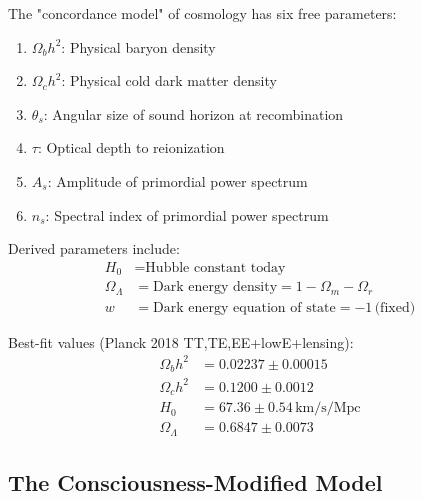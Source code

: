 \begin{defn}\label{def:lambdacdm-parameters}
The "concordance model" of cosmology\cite{planck2018} has six free parameters:
\begin{enumerate}
\item $\Omega_b h^2$: Physical baryon density
\item $\Omega_c h^2$: Physical cold dark matter density
\item $\theta_s$: Angular size of sound horizon at recombination
\item $\tau$: Optical depth to reionization
\item $A_s$: Amplitude of primordial power spectrum
\item $n_s$: Spectral index of primordial power spectrum
\end{enumerate}

Derived parameters include:
\begin{align}
H_0 &= \text{Hubble constant today} \\
\Omega_\Lambda &= \text{Dark energy density} = 1 - \Omega_m - \Omega_r \\
w &= \text{Dark energy equation of state} = -1 \, \text{(fixed)}
\end{align}

Best-fit values (Planck 2018 TT,TE,EE+lowE+lensing)\cite{planck2018}:
\begin{align}
\Omega_b h^2 &= 0.02237 \pm 0.00015 \\
\Omega_c h^2 &= 0.1200 \pm 0.0012 \\
H_0 &= 67.36 \pm 0.54 \, \text{km/s/Mpc} \\
\Omega_\Lambda &= 0.6847 \pm 0.0073
\end{align}
\end{defn}

\subsection{The Consciousness-Modified Model}

